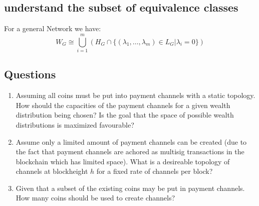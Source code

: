 \documentclass[10pt,twocolumn]{article}
\begin{document}
\subsection{understand the subset of equivalence classes}
For a general Network we have:
\begin{equation}
  W_G \cong \bigcup_{i=1}^m\left(H_G\cap\{(\lambda_1,\dots,\lambda_m)\in L_G|\lambda_i = 0\}\right)
  \end{equation}

\subsection{Questions}
\begin{enumerate}
\item Assuming all coins must be put into payment channels with a static topology. How should the capacities of the payment channels for a given wealth distribution being chosen? Is the goal that the space of possible wealth distributions is maximized favourable? 
\item Assume only a limited amount of payment channels can be created (due to the fact that payment channels are achored as multisig transactions in the blockchain which has limited space). What is a desireable topology of channels at blockheight $h$ for a fixed rate of channels per block?
\item Given that a subset of the existing coins may be put in payment channels. How many coins should be used to create channels?
\end{enumerate}
\end{document}
